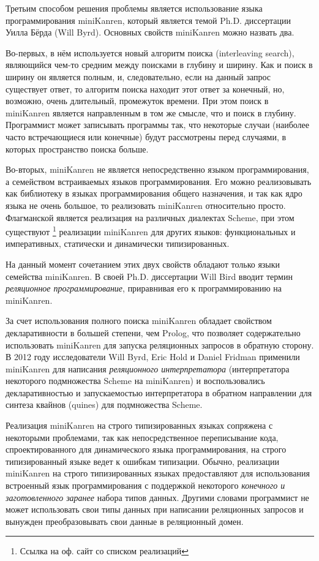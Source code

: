 Третьим способом решения проблемы является использование языка программирования miniKanren, который является темой Ph.D. диссертации Уилла Бёрда (Will Byrd). Основных свойств miniKanren можно назвать два.

Во-первых, в нём используется новый алгоритм поиска (interleaving search), являющийся чем-то средним между поисками в глубину и ширину. Как и поиск в ширину он является полным, и, следовательно, если на данный запрос существует ответ, то алгоритм поиска находит этот ответ за конечный, но, возможно, очень длительный, промежуток времени. При этом поиск в miniKanren является направленным в том же смысле, что и поиск в глубину. Программист может записывать программы так, что некоторые случаи (наиболее часто встречающиеся или конечные) будут рассмотрены перед случаями, в которых пространство поиска больше.

Во-вторых, miniKanren не является непосредственно языком программирования, а семейством встраиваемых языков программирования. Его можно реализовывать как библиотеку в языках программирования общего назначения, и так как ядро языка не очень большое, то реализовать miniKanren относительно просто. Флагманской является реализация на различных диалектах Scheme, при этом существуют \footnote{Ссылка на оф. сайт со списком реализаций} реализации miniKanren для других языков: функциональных и императивных, статически и динамически типизированных.

На данный момент сочетанием этих двух свойств обладают только языки семейства miniKanren. В своей Ph.D. диссертации Will Bird вводит термин \emph{реляционное программирование}, приравнивая его к программированию на miniKanren.

За счет использования полного поиска miniKanren обладает свойством декларативности в большей степени, чем Prolog, что позволяет содержательно использовать miniKanren для запуска реляционных запросов в обратную сторону. В 2012 году исследователи Will Byrd, Eric Hold и Daniel Fridman применили miniKanren для написания \emph{реляционного интерпретатора} (интерпретатора некоторого подмножества Scheme на miniKanren) и воспользовались декларативностью и запускаемостью интерпретатора в обратном направлении для синтеза квайнов (quines) для подмножества Scheme.

Реализация miniKanren на строго типизированных языках сопряжена с некоторыми проблемами, так как непосредственное переписывание кода, спроектированного для динамического языка программирования, на строго типизированный языке ведет к ошибкам типизации. Обычно, реализации miniKanren на строго типизированных языках предоставляют для использования встроенный язык программирования с поддержкой некоторого \emph{конечного и заготовленного заранее} набора типов данных. Другими словами программист не может использовать свои типы данных при написании реляционных запросов и вынужден преобразовывать свои данные в реляционный домен.

